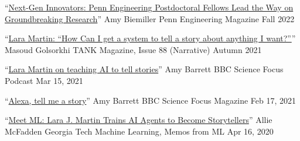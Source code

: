 {\color{black}\fontsize{12pt}{1em}} 






  \cvmedia
    {``\href{https://magazine.seas.upenn.edu/fall-2022/next-gen-innovators/}{Next-Gen Innovators: Penn Engineering Postdoctoral Fellows Lead the Way on Groundbreaking Research}''} %
    {Amy Biemiller} %
    {Penn Engineering Magazine} %
    {Fall 2022} %

  \cvmedia
    {``\href{https://tankmagazine.com/issue-88/talk/lara-martin}{Lara Martin: ``How Can I get a system to tell a story about anything I want?''}''} %
    {Masoud Golsorkhi} %
    {TANK Magazine, Issue 88 (Narrative)} %
    {Autumn 2021} %

  \cvmedia
    {``\href{https://www.sciencefocus.com/future-technology/lara-martin-on-teaching-ai-to-tell-stories/}{Lara Martin on teaching AI to tell stories}''} %
    {Amy Barrett} %
    {BBC Science Focus Podcast} %
    {Mar 15, 2021} %

  \cvmedia
    {``\href{https://www.sciencefocus.com/magazine/dark-stars/}{Alexa, tell me a story}''} %
    {Amy Barrett} %
    {BBC Science Focus Magazine} %
    {Feb 17, 2021} %

  \cvmedia
    {``\href{https://mlatgt.blog/2020/04/16/meet-mlgt-lara-j-martin-trains-ai-agents-to-become-storytellers/}{Meet ML\@GT: Lara J. Martin Trains AI Agents to Become Storytellers}''} %
    {Allie McFadden} %
    {Georgia Tech Machine Learning, Memos from ML\@GT} %
    {Apr 16, 2020} %

